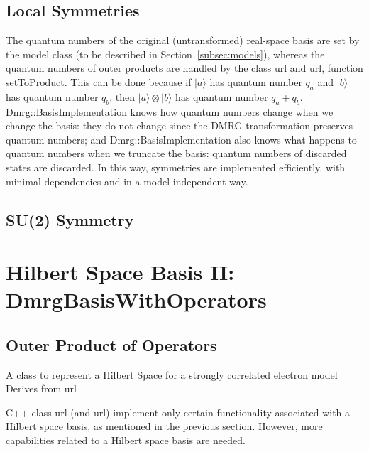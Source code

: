 \documentclass[paper=letter]{scrartcl}
\newcommand{\cppClass}[1]{{\sffamily #1}}
\begin{document}
\subsection{Local Symmetries}
The quantum numbers of the original (untransformed) real-space basis are set by the model class (to be described in Section~\ref{subsec:models}), whereas the quantum numbers of outer products are handled by the class \cppClass{url} and \cppClass{url}, function {setToProduct}. This can be done because if $|a\rangle$ has quantum number $q_a$ and $|b\rangle$ has quantum number $q_b$, then $|a\rangle\otimes|b\rangle$ has quantum number $q_a+q_b$. \cppClass{Dmrg::BasisImplementation} knows how quantum numbers change when we change the basis: they do not change since the DMRG transformation preserves quantum numbers; and \cppClass{Dmrg::BasisImplementation} also knows what happens to quantum numbers when we truncate the basis: quantum numbers of discarded states are discarded. In this way, symmetries are implemented efficiently, with minimal dependencies and in a model-independent way.

\subsection{SU(2) Symmetry}

\section{Hilbert Space Basis II: DmrgBasisWithOperators}
\subsection{Outer Product of Operators}\label{subsec:dmrgBasisWithOperators}
A class to represent a Hilbert Space for a strongly correlated electron model Derives from url

C++ class \cppClass{url} (and \cppClass{url}) implement only certain functionality associated with a Hilbert space basis, as mentioned in the previous section. However, more capabilities related to a Hilbert space basis are needed.
\end{document}
